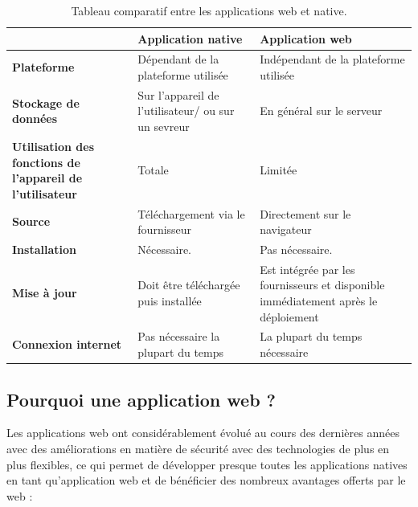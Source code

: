         \begin{table}[!h]
  \small
  \centering
  \footnotesize{
   \begin{tabular}{|p{4cm}|p{4cm}|p{4cm}|} %
    \hline
      & \textbf{Application native} & \textbf{Application web} \\
    \hline
   \textbf{Plateforme} & Dépendant de la plateforme utilisée & Indépendant de la plateforme utilisée \\
    \hline
    \textbf{Stockage de données} & Sur l’appareil de l’utilisateur/ ou sur un sevreur & En général sur le serveur \\
    \hline
    \textbf{Utilisation des fonctions de l’appareil de l’utilisateur} & Totale & Limitée \\
    \hline
    \textbf{Source} & Téléchargement via le fournisseur & Directement sur le navigateur \\
    \hline
    \textbf{Installation} & Nécessaire. & Pas nécessaire. \\
    \hline
    \textbf{Mise à jour} & Doit être téléchargée puis installée & Est intégrée par les fournisseurs et disponible immédiatement après le déploiement \\
    \hline
    \textbf{Connexion internet} & Pas nécessaire la plupart du temps & La plupart du temps nécessaire \\
    \hline
                \end{tabular}}
                \caption{Tableau comparatif entre les applications web et native.} 
                \label{tab1}
        \end{table}
    
    \subsection{Pourquoi une application web ?}
        Les applications web ont considérablement évolué au cours des dernières années avec des améliorations en matière de sécurité avec des technologies de plus en plus flexibles, ce qui permet de développer presque toutes les applications natives en tant qu’application web et de bénéficier des nombreux avantages offerts par le web :
        
